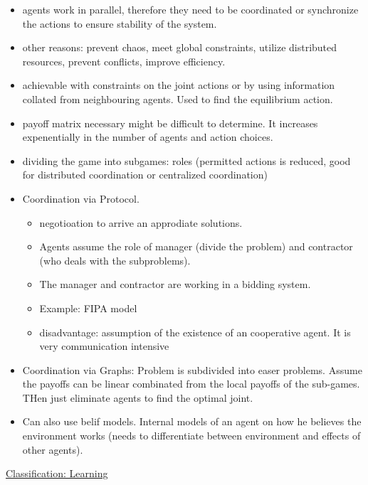 \begin{itemize}[noitemsep,nolistsep]
	\item agents work in parallel, therefore they need to be coordinated or synchronize the actions to ensure stability of the system.
	\item other reasons: prevent chaos, meet global constraints, utilize distributed resources, prevent conflicts, improve efficiency.
	\item achievable with constraints on the joint actions or by using information collated from neighbouring agents. Used to find the equilibrium action.
	\item payoff matrix necessary might be difficult to determine. It increases expenentially in the number of agents and action choices.
	\item dividing the game into subgames: roles (permitted actions is reduced, good for distributed coordination or centralized coordination)
	\item Coordination via Protocol.
	\begin{itemize}[noitemsep,nolistsep]
		\item negotioation to arrive an approdiate solutions.
		\item Agents assume the role of manager (divide the problem) and contractor (who deals with the subproblems).
		\item The manager and contractor are working in a bidding system.
		\item Example: FIPA model
		\item disadvantage: assumption of the existence of an cooperative agent. It is very communication intensive
	\end{itemize}
	\item Coordination via Graphs: Problem is subdivided into easer problems. Assume the payoffs can be linear combinated from the local payoffs of the sub-games. THen just eliminate agents to find the optimal joint.
	\item Can also use belif models. Internal models of an agent on how he believes the environment works (needs to differentiate between environment and effects of other agents).
\end{itemize}
\underline{Classification: Learning}
